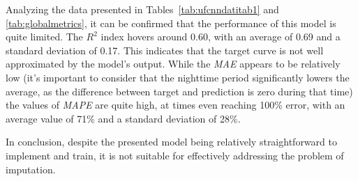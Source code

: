 Analyzing the data presented in Tables~\ref{tab:ufcnndatitab1}
and \ref{tab:globalmetrics}, it can be confirmed that the performance
of this model is quite limited.
The $R^2$ index hovers around 0.60, with an average of 0.69 and a standard deviation of 0.17. This indicates that the target curve is not well approximated by the model's output.
While the \textit{MAE} appears to be relatively low (it's
important to consider that the nighttime period significantly lowers
the average, as the difference between target and prediction is zero during that time) the values of \textit{MAPE} are quite high, at times even reaching 100\% error, with an average value of 71\% and a standard deviation of 28\%.

In conclusion, despite the presented model being relatively
straightforward to implement and train, it is not suitable for
effectively addressing the problem of imputation.

